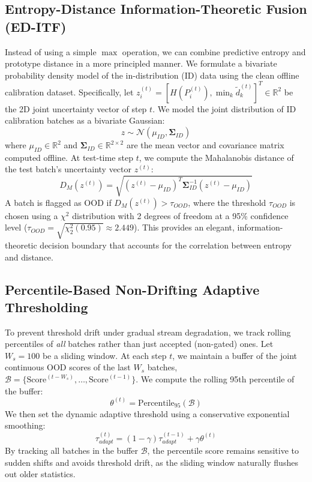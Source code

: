 \documentclass{article}
\theoremstyle{plain}
\theoremstyle{definition}
\theoremstyle{remark}
\begin{document}
\subsection{Entropy-Distance Information-Theoretic Fusion (ED-ITF)}
Instead of using a simple $\max$ operation, we can combine predictive entropy and prototype distance in a more principled manner. We formulate a bivariate probability density model of the in-distribution (ID) data using the clean offline calibration dataset.
Specifically, let $z_i^{(t)} = \left[ H(P_i^{(t)}), \min_k \tilde{d}_k^{(t)} \right]^T \in \mathbb{R}^2$ be the 2D joint uncertainty vector of step $t$. We model the joint distribution of ID calibration batches as a bivariate Gaussian:
\begin{equation}
    z \sim \mathcal{N}(\mu_{ID}, \mathbf{\Sigma}_{ID})
\end{equation}
where $\mu_{ID} \in \mathbb{R}^2$ and $\mathbf{\Sigma}_{ID} \in \mathbb{R}^{2 \times 2}$ are the mean vector and covariance matrix computed offline.
At test-time step $t$, we compute the Mahalanobis distance of the test batch's uncertainty vector $z^{(t)}$:
\begin{equation}
    D_M(z^{(t)}) = \sqrt{(z^{(t)} - \mu_{ID})^T \mathbf{\Sigma}_{ID}^{-1} (z^{(t)} - \mu_{ID})}
\end{equation}
A batch is flagged as OOD if $D_M(z^{(t)}) > \tau_{OOD}$, where the threshold $\tau_{OOD}$ is chosen using a $\chi^2$ distribution with 2 degrees of freedom at a 95\% confidence level ($\tau_{OOD} = \sqrt{\chi^2_{2}(0.95)} \approx 2.449$). This provides an elegant, information-theoretic decision boundary that accounts for the correlation between entropy and distance.

\subsection{Percentile-Based Non-Drifting Adaptive Thresholding}
To prevent threshold drift under gradual stream degradation, we track rolling percentiles of \textit{all} batches rather than just accepted (non-gated) ones. Let $W_s = 100$ be a sliding window. At each step $t$, we maintain a buffer of the joint continuous OOD scores of the last $W_s$ batches, $\mathcal{B} = \{ \text{Score}^{(t-W_s)}, \dots, \text{Score}^{(t-1)} \}$.
We compute the rolling 95th percentile of the buffer:
\begin{equation}
    \theta^{(t)} = \text{Percentile}_{95}(\mathcal{B})
\end{equation}
We then set the dynamic adaptive threshold using a conservative exponential smoothing:
\begin{equation}
    \tau_{adapt}^{(t)} = (1 - \gamma) \tau_{adapt}^{(t-1)} + \gamma \theta^{(t)}
\end{equation}
By tracking all batches in the buffer $\mathcal{B}$, the percentile score remains sensitive to sudden shifts and avoids threshold drift, as the sliding window naturally flushes out older statistics.
\end{document}
